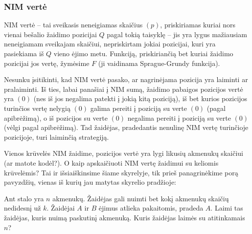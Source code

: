 \subsubsection{NIM vertė}

\begin{api}
  NIM vertė -- tai sveikasis neneigiamas skaičius $(p)$, priskiriamas kuriai
  nors vienai bešalio žaidimo pozicijai $Q$ pagal tokią taisyklę -- jis yra
  lygus mažiausiam neneigiamam sveikajam skaičiui, nepriskirtam jokiai
  pozicijai, kuri yra pasiekiama iš $Q$ vieno ėjimo metu. Funkciją,
  priskiriančią bet kuriai žaidimo pozicijai jos vertę, žymėsime $F$ (ji
  vaidinama Sprague-Grundy funkcija).
\end{api}

Nesunku įsitikinti, kad NIM vertė pasako, ar nagrinėjama pozicija yra
laiminti ar pralaiminti. Iš ties, labai panašiai į NIM sumą, žaidimo
pabaigos pozicijos vertė yra $(0)$ (nes iš jos negalima patekti į jokią
kitą poziciją), iš bet kurios pozicijos turinčios vertę nelygią $(0)$
galima pereiti į poziciją su verte $(0)$ (pagal apibrėžimą), o iš pozicijos
su verte $(0)$ negalima pereiti į poziciją su verte $(0)$ (vėlgi pagal
apibrėžimą). Tad žaidėjas, pradedantis nenulinę NIM vertę turinčioje
pozicijoje, turi laiminčią strategiją.

Vienos krūvelės NIM žaidime, pozicijos vertė yra lygi likusių akmenukų
skaičiui (ar matote kodėl?). O kaip apskaičiuoti NIM vertę žaidimui su
keliomis krūvelėmis? Tai ir išsiaiškinsime šiame skyrelyje, tik prieš
panagrinėkime porą pavyzdžių, vienas iš kurių jau matytas skyrelio
pradžioje:

\begin{pav}
  Ant stalo yra $n$ akmenukų. Žaidėjas gali nuimti bet kokį akmenukų skaičių
  nedidesnį už $k$. Žaidėjai $A$ ir $B$ ėjimus atlieka pakaitomis, pradeda $A$.
  Laimi tas žaidėjas, kuris nuimą paskutinį akmenuką. Kuris žaidėjas laimės su
  atitinkamais $n$?
\end{pav}

